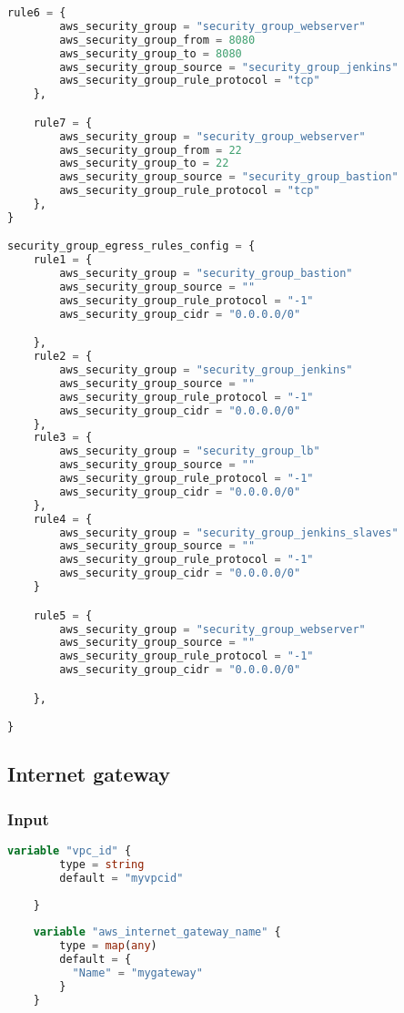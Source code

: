 \begin{lstlisting}[language=terraform]
    rule6 = {
        aws_security_group = "security_group_webserver"
        aws_security_group_from = 8080
        aws_security_group_to = 8080
        aws_security_group_source = "security_group_jenkins"
        aws_security_group_rule_protocol = "tcp"
    },

    rule7 = {
        aws_security_group = "security_group_webserver"
        aws_security_group_from = 22
        aws_security_group_to = 22
        aws_security_group_source = "security_group_bastion"
        aws_security_group_rule_protocol = "tcp"
    },
}

security_group_egress_rules_config = {
    rule1 = {
        aws_security_group = "security_group_bastion"
        aws_security_group_source = ""
        aws_security_group_rule_protocol = "-1"
        aws_security_group_cidr = "0.0.0.0/0"

    },
    rule2 = {
        aws_security_group = "security_group_jenkins"
        aws_security_group_source = ""
        aws_security_group_rule_protocol = "-1"
        aws_security_group_cidr = "0.0.0.0/0"
    },
    rule3 = {
        aws_security_group = "security_group_lb"
        aws_security_group_source = ""
        aws_security_group_rule_protocol = "-1"
        aws_security_group_cidr = "0.0.0.0/0"
    },
    rule4 = {
        aws_security_group = "security_group_jenkins_slaves"
        aws_security_group_source = ""
        aws_security_group_rule_protocol = "-1"
        aws_security_group_cidr = "0.0.0.0/0"
    }

    rule5 = {
        aws_security_group = "security_group_webserver"
        aws_security_group_source = ""
        aws_security_group_rule_protocol = "-1"
        aws_security_group_cidr = "0.0.0.0/0"

    },

}
\end{lstlisting}

\subsection{
{Internet gateway}}
\label{sec:Internet gateway}

\subsubsection{
{Input}}

\begin{lstlisting}[language=terraform]
    variable "vpc_id" {
        type = string
        default = "myvpcid"
    
    }
    
    variable "aws_internet_gateway_name" {
        type = map(any)
        default = {
          "Name" = "mygateway" 
        }
    }
\end{lstlisting}

